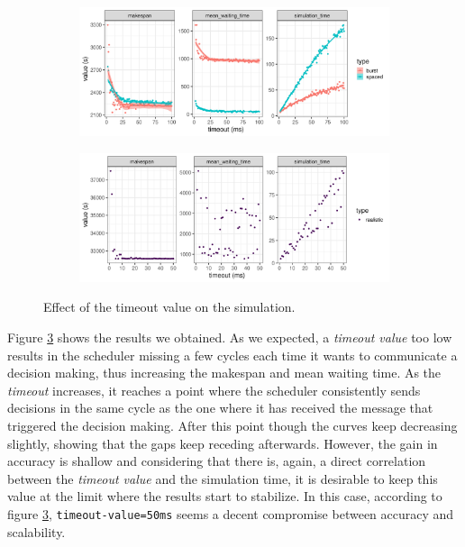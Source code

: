 \begin{figure}
	\begin{subfigure}{\textwidth}
		\centering
		\includegraphics[width=\textwidth]{imgs/timeout_burst_spaced.png}
		\caption{}
		\label{fig:timeout_burst_sp}
	\end{subfigure}

	\begin{subfigure}{\textwidth}
		\centering
		\includegraphics[width=\textwidth]{imgs/timeout_realistic.png}
		\caption{}
		\label{fig:timeout_real}
	\end{subfigure}

	\caption{Effect of the timeout value on the simulation.}
	\label{fig:timeout}
\end{figure}

Figure \ref{fig:timeout} shows the results we obtained. As we expected, a
\textit{timeout value} too low results in the scheduler missing a few cycles
each time it wants to communicate a decision making, thus increasing the
makespan and mean waiting time. As the \textit{timeout} increases, it reaches a
point where the scheduler consistently sends decisions in the same cycle as the
one where it has received the message that triggered the decision making. After
this point though the curves keep decreasing slightly, showing that the gaps
keep receding afterwards. However, the gain in accuracy is shallow and
considering that there is, again, a direct correlation between the
\textit{timeout value} and the simulation time, it is desirable to keep this
value at the limit where the results start to stabilize.  In this case,
according to figure \ref{fig:timeout}, \texttt{timeout-value=50ms} seems a
decent compromise between accuracy and scalability.

